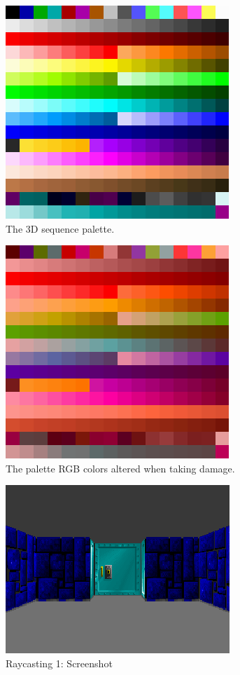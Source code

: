 \documentclass[book.tex]{subfiles}
\begin{document}
\begin{figure}[H]
  \centering
 \includegraphics[scale=1.3]{imgs/palette.png}
 \caption{The 3D sequence palette.} \label{fig:palette}
\end{figure}


\begin{figure}[H]
  \centering
 \includegraphics[scale=1.3]{imgs/palette_damage.png}
 \caption{The palette RGB colors altered when taking damage.} \label{fig:palette_damage}
\end{figure}



\begin{figure}[H]
  \centering
 \includegraphics[scale=1.3]{imgs/ray_caster_explained/beginning.png}
 \caption{Raycasting 1: Screenshot} \label{fig:Raycasting2Drawing}
\end{figure}
\end{document}
